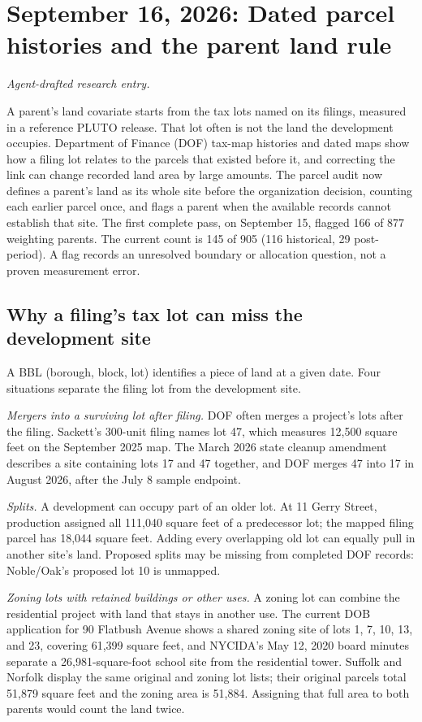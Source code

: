 \clearpage
\section*{September 16, 2026: Dated parcel histories and the parent land rule}
\textit{Agent-drafted research entry.}

A parent's land covariate starts from the tax lots named on its filings,
measured in a reference PLUTO release. That lot often is not the land the
development occupies. Department of Finance (DOF) tax-map histories and dated
maps show how a filing lot relates to the parcels that existed before it, and
correcting the link can change recorded land area by large amounts. The parcel
audit now defines a parent's land as its whole site before the organization
decision, counting each earlier parcel once, and flags a parent when the
available records cannot establish that site. The first complete pass, on
September 15, flagged 166 of 877 weighting parents. The current count is
145 of 905 (116 historical, 29 post-period). A flag records an
unresolved boundary or allocation question, not a proven measurement error.

\subsection*{Why a filing's tax lot can miss the development site}

A BBL (borough, block, lot) identifies a piece of land at a given date. Four
situations separate the filing lot from the development site.

\textit{Mergers into a surviving lot after filing.} DOF often merges a
project's lots after the filing. Sackett's 300-unit filing names lot 47, which
measures 12,500 square feet on the September 2025 map. The March 2026 state
cleanup amendment describes a site containing lots 17 and 47 together, and DOF
merges 47 into 17 in August 2026, after the July 8 sample endpoint.

\textit{Splits.} A development can occupy part of an older lot. At 11 Gerry
Street, production assigned all 111,040 square feet of a predecessor lot; the
mapped filing parcel has 18,044 square feet. Adding every overlapping old lot
can equally pull in another site's land. Proposed splits may be missing from
completed DOF records: Noble/Oak's proposed lot 10 is unmapped.

\textit{Zoning lots with retained buildings or other uses.} A zoning lot can
combine the residential project with land that stays in another use. The
current DOB application for 90 Flatbush Avenue shows a shared zoning site of
lots 1, 7, 10, 13, and 23, covering 61,399 square feet, and NYCIDA's May 12,
2020 board minutes separate a 26,981-square-foot school site from the
residential tower. Suffolk and Norfolk display the same original and zoning
lot lists; their original parcels total 51,879 square feet and the zoning area
is 51,884. Assigning that full area to both parents would count the land twice.

